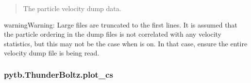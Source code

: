 \documentclass[letterpaper,10pt,english,openany,oneside]{sphinxmanual}
\begin{document}
\begin{fulllineitems}
\begin{fulllineitems}
\begin{quote}
\begin{description}
\begin{itemize}
\end{itemize}

\sphinxAtStartPar
The particle velocity dump data.

\sphinxAtStartPar
{}

\end{description}\end{quote}

\begin{sphinxadmonition}{warning}{Warning:}
\sphinxAtStartPar
Large files are truncated to the first  lines.
It is assumed that the particle ordering in the dump files
is not correlated with any velocity statistics, but
this may not be the case when  is on. In that case, ensure
the entire velocity dump file is being read.
\end{sphinxadmonition}

\end{fulllineitems}


\sphinxstepscope


\subsubsection{pytb.ThunderBoltz.plot\_cs}
\label{\detokenize{api/pytb.ThunderBoltz.plot_cs:pytb-thunderboltz-plot-cs}}\label{\detokenize{api/pytb.ThunderBoltz.plot_cs::doc}}


\end{fulllineitems}
\end{document}
